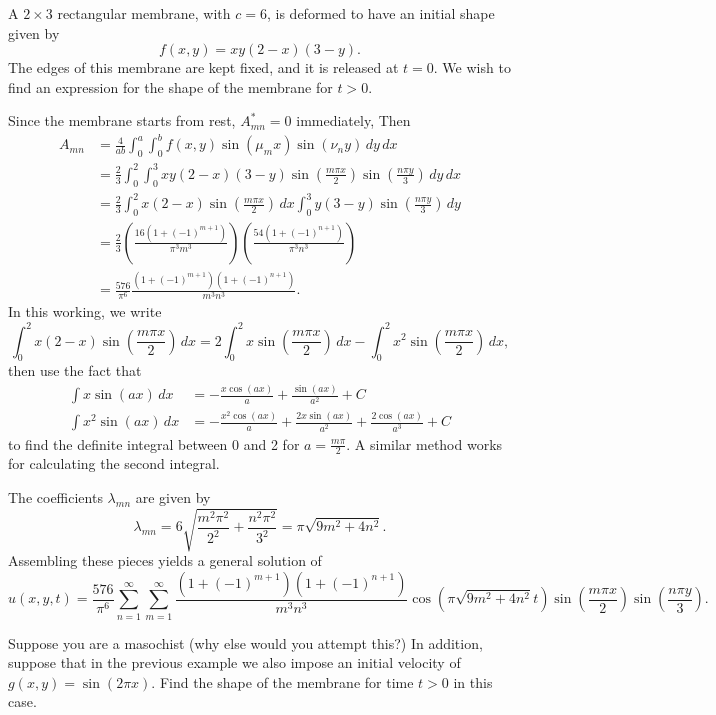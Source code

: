 \begin{eg}\label{eg:waveeqn2drect}
	A $2 \times 3$ rectangular membrane, with $c=6$, is deformed to have an initial shape given by
	\[
	f(x,y) = xy(2-x)(3-y).
	\]
	The edges of this membrane are kept fixed, and it is released at $t=0$. We wish to find an expression for the shape of the membrane for $t>0$.
	
	Since the membrane starts from rest, $A_{mn}^* = 0$ immediately, Then
	\begin{align*}
		A_{mn} &= \frac{4}{ab} \int_0^a \int_0^b f(x,y) \sin(\mu_m x) \sin(\nu_n y) \,dy\,dx \\
		&= \frac23 \int_0^2 \int_0^3 xy(2-x)(3-y) \sin\left(\frac{m\pi x}{2}\right) \sin\left(\frac{n\pi y}{3}\right) \,dy\,dx \\
		&= \frac23 \int_0^2 x(2-x) \sin\left(\frac{m\pi x}{2}\right) \,dx \int_0^3 y(3-y) \sin\left(\frac{n\pi y}{3}\right) \,dy \\
		&= \frac23 \left(\frac{16\left(1+(-1)^{m+1}\right)}{\pi^3 m^3}\right) \left(\frac{54\left(1+(-1)^{n+1}\right)}{\pi^3 n^3}\right) \\
		&= \frac{576}{\pi^6} \frac{\left(1+(-1)^{m+1}\right) \left(1+(-1)^{n+1}\right)}{m^3n^3}.
	\end{align*}
	In this working, we write
	\[
	\int_0^2 x(2-x) \sin\left(\frac{m\pi x}{2}\right) \,dx = 2\int_0^2 x \sin\left(\frac{m\pi x}{2}\right) \,dx - \int_0^2 x^2 \sin\left(\frac{m\pi x}{2}\right) \,dx,
	\]
	then use the fact that
	\begin{align*}
		\int x\sin(ax)\,dx &= -\frac{x\cos(ax)}{a} + \frac{\sin(ax)}{a^2} + C \\
		\int x^2\sin(ax)\,dx &= -\frac{x^2\cos(ax)}{a} + \frac{2x\sin(ax)}{a^2} + \frac{2\cos(ax)}{a^3} + C
	\end{align*}
	to find the definite integral between 0 and 2 for $a = \frac{m\pi}{2}$. A similar method works for calculating the second integral.
	
	The coefficients $\lambda_{mn}$ are given by
	\[
	\lambda_{mn} = 6\sqrt{\frac{m^2\pi^2}{2^2} + \frac{n^2\pi^2}{3^2}} = \pi\sqrt{9m^2+4n^2}.
	\]
	Assembling these pieces yields a general solution of
	\[
	u(x,y,t) = \frac{576}{\pi^6} \sum_{n=1}^{\infty} \sum_{m=1}^{\infty} \frac{\left(1+(-1)^{m+1}\right) \left(1+(-1)^{n+1}\right)}{m^3n^3} \cos\left(\pi\sqrt{9m^2+4n^2}t\right) \sin\left(\frac{m\pi x}{2}\right) \sin\left(\frac{n\pi y}{3}\right).
	\]
\end{eg}

\begin{exercise}
	Suppose you are a masochist (why else would you attempt this?) In addition, suppose that in the previous example we also impose an initial velocity of $g(x,y) = \sin(2\pi x)$. Find the shape of the membrane for time $t>0$ in this case.
\end{exercise}


